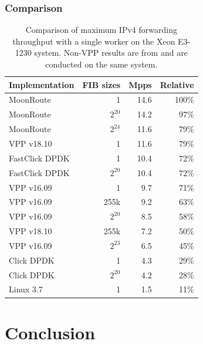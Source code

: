 \begin{frame}
    \frametitle{Comparison}
    \begin{table}
        \begin{tabular}[]{ l r r r }
            Implementation   & FIB sizes & Mpps     & Relative \\ 
            \midrule
            MoonRoute        & 1         & 14.6     & 100\% \\
            MoonRoute        & $2^{20}$  & 14.2     & 97\% \\
            MoonRoute        & $2^{24}$  & 11.6     & 79\% \\
            VPP v18.10       & 1         & 11.6     & 79\% \\
            FastClick DPDK   & 1         & 10.4     & 72\% \\
            FastClick DPDK   & $2^{20}$  & 10.4     & 72\% \\
            VPP v16.09       & 1         & 9.7      & 71\% \\
            VPP v16.09       & 255k      & 9.2      & 63\% \\
            VPP v16.09       & $2^{20}$  & 8.5      & 58\% \\
            VPP v18.10       & 255k      & 7.2      & 50\% \\
            VPP v16.09       & $2^{23}$  & 6.5      & 45\% \\
            Click DPDK       & 1         & 4.3      & 29\% \\
            Click DPDK       & $2^{20}$  & 4.2      & 28\% \\
            Linux 3.7        & 1         & 1.5      & 11\% \\

            \midrule
        \end{tabular}
        \caption{Comparison of maximum IPv4 forwarding throughput with a single worker on the Xeon E3-1230 system. Non-VPP results are from \cite{chair:architecture} and are conducted on the same system. }
        \label{table:comparison}
    \end{table}
\end{frame}

\section{Conclusion}

